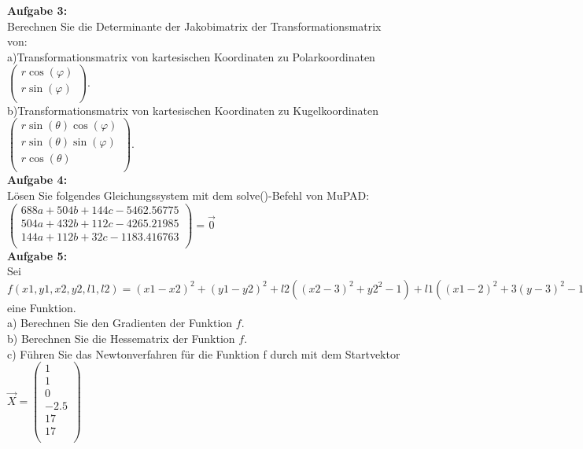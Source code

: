\documentclass[11pt,final]{scrreprt}
\newcommand{\br} {\medskip\\}
\begin{document}
\textbf{Aufgabe 3:}\\

Berechnen Sie die Determinante der Jakobimatrix der Transformationsmatrix von:\\

a)Transformationsmatrix  von kartesischen Koordinaten zu Polarkoordinaten\\
\hspace*{2em}$\left(\begin{matrix}
r\cos(\varphi)\\
r\sin(\varphi)\\
\end{matrix}\right)$.\br

b)Transformationsmatrix von kartesischen Koordinaten zu Kugelkoordinaten\\
\hspace*{2em}$\left(\begin{matrix}
r\sin(\theta)\cos(\varphi)\\
r\sin(\theta)\sin(\varphi)\\
r\cos(\theta)\\
\end{matrix}\right)$.\br

\textbf{Aufgabe 4:}\\

Lösen Sie folgendes Gleichungssystem mit dem solve()-Befehl von MuPAD:\\
$\left(\begin{matrix}
688a + 504b + 144c - 5462.56775\\
504a + 432b + 112c - 4265.21985\\
144a + 112b + 32c - 1183.416763\\
\end{matrix}\right) = \overrightarrow{0}$\br

\textbf{Aufgabe 5:}\\
Sei $f(x1, y1, x2, y2, l1, l2) = (x1-x2)^2+(y1-y2)^2+l2((x2-3)^2+y2^2-1)+l1((x1-2)^2+3(y -3)^2-1)$ eine Funktion.\\

a) Berechnen Sie den Gradienten der Funktion $f$.\\
b) Berechnen Sie die Hessematrix der Funktion $f$.\\
c) Führen Sie das Newtonverfahren für die Funktion f durch mit dem Startvektor\\
\hspace*{2em}$\overrightarrow{X} = \left(\begin{matrix}
1\\
1\\
0\\
-2.5\\
17\\
17\\
\end{matrix}\right)$
\end{document}

